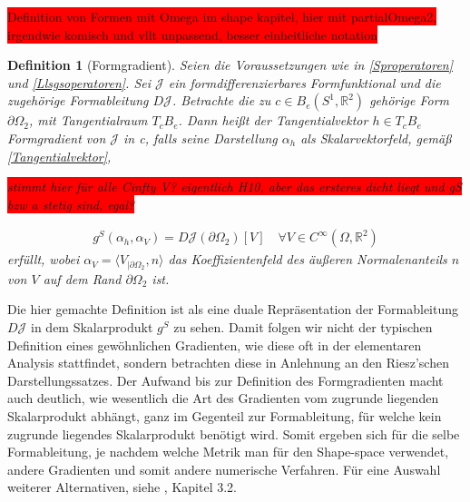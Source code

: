\documentclass[bibliography=totoc,12pt,a4paper]{scrartcl}
\theoremstyle{exampstyle}
\newtheorem{defi}{Definition}%
\numberwithin{equation}{section}
\begin{document}
\colorbox{red}{Definition von Formen mit Omega im shape kapitel, hier mit partialOmega2, irgendwie komisch und vllt unpassend, besser einheitliche notation}

\begin{defi}[Formgradient]\label{Formgradientdefi}
Seien die Voraussetzungen wie in \ref{Sproperatoren} und \ref{Llsgsoperatoren}.
Sei $\mathcal{J}$ ein formdifferenzierbares Formfunktional und die zugehörige Formableitung $D\mathcal{J}$. Betrachte die zu $c\in B_e(S^1,\mathbb{R}^2)$ gehörige Form $\partial\Omega_2$, mit Tangentialraum $T_cB_e$. Dann heißt der Tangentialvektor $h\in T_cB_e$ \textit{Formgradient von} $\mathcal{J}$ \textit{in c}, falls seine Darstellung $\alpha_h$ als Skalarvektorfeld, gemäß \ref{Tangentialvektor},

\colorbox{red}{stimmt hier für alle Cinfty V? eigentlich H10, aber das ersteres dicht liegt und gS bzw a stetig sind, egal?}

\begin{align}\label{Gradientengleichung}
	g^S(\alpha_h, \alpha_V) = D\mathcal{J}(\partial \Omega_2)[V] \quad \forall V\in C^\infty(\Omega,\mathbb{R}^2)
\end{align}
erfüllt, wobei $\alpha_V = \langle V_{\vert \partial\Omega_2}, n\rangle$ das Koeffizientenfeld des äußeren Normalenanteils $n$ von $V$ auf dem Rand $\partial \Omega_2$ ist.

\end{defi}

Die hier gemachte Definition ist als eine duale Repräsentation der Formableitung $D\mathcal{J}$ in dem Skalarprodukt $g^S$ zu sehen. Damit folgen wir nicht der typischen Definition eines gewöhnlichen Gradienten, wie diese oft in der elementaren Analysis stattfindet, sondern betrachten diese in Anlehnung an den  Riesz'schen Darstellungssatzes. Der Aufwand bis zur Definition des Formgradienten macht auch deutlich, wie wesentlich die Art des Gradienten vom zugrunde liegenden Skalarprodukt abhängt, ganz im Gegenteil zur Formableitung, für welche kein zugrunde liegendes Skalarprodukt benötigt wird. Somit ergeben sich für die selbe Formableitung, je nachdem welche Metrik man für den Shape-space verwendet, andere Gradienten und somit andere numerische Verfahren. Für eine Auswahl weiterer Alternativen, siehe \cite{shape_space}, Kapitel 3.2.
\end{document}
